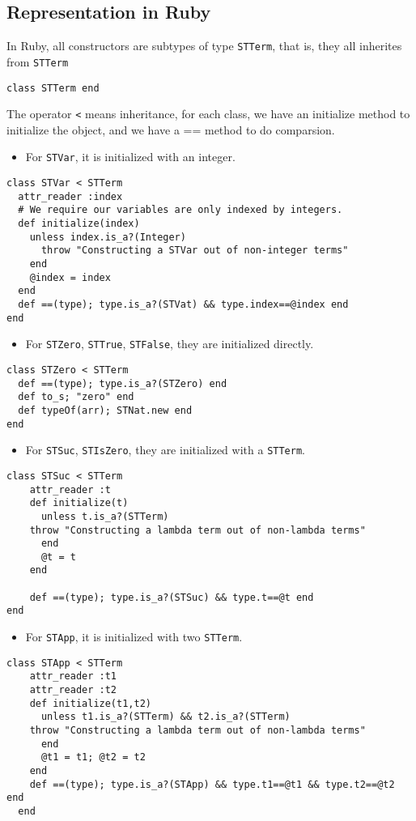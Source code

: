 \documentclass[11pt]{article}
\begin{document}
\subsection{Representation in Ruby}
\label{sec:org5bd2398}
In Ruby, all constructors are subtypes of type \texttt{STTerm}, that is, they all inherites from \texttt{STTerm}
\begin{verbatim}
class STTerm end
\end{verbatim}

The operator \texttt{<} means inheritance, for each class, we have an initialize method to initialize the object, and we have a == method to do comparsion.
\begin{itemize}
\item For \texttt{STVar}, it is initialized with an integer.
\end{itemize}
\begin{verbatim}
class STVar < STTerm
  attr_reader :index
  # We require our variables are only indexed by integers.
  def initialize(index)
    unless index.is_a?(Integer) 
      throw "Constructing a STVar out of non-integer terms"
    end
    @index = index
  end
  def ==(type); type.is_a?(STVat) && type.index==@index end
end
\end{verbatim}

\begin{itemize}
\item For \texttt{STZero}, \texttt{STTrue}, \texttt{STFalse}, they are initialized directly.
\end{itemize}
\begin{verbatim}
class STZero < STTerm
  def ==(type); type.is_a?(STZero) end
  def to_s; "zero" end
  def typeOf(arr); STNat.new end
end
\end{verbatim}

\begin{itemize}
\item For \texttt{STSuc}, \texttt{STIsZero}, they are initialized with a \texttt{STTerm}.
\end{itemize}
\begin{verbatim}
class STSuc < STTerm
    attr_reader :t
    def initialize(t)
      unless t.is_a?(STTerm)
	throw "Constructing a lambda term out of non-lambda terms"
      end
      @t = t
    end

    def ==(type); type.is_a?(STSuc) && type.t==@t end
end
\end{verbatim}

\begin{itemize}
\item For \texttt{STApp}, it is initialized with two \texttt{STTerm}.
\end{itemize}
\begin{verbatim}
class STApp < STTerm
    attr_reader :t1
    attr_reader :t2
    def initialize(t1,t2)
      unless t1.is_a?(STTerm) && t2.is_a?(STTerm)
	throw "Constructing a lambda term out of non-lambda terms"
      end
      @t1 = t1; @t2 = t2
    end
    def ==(type); type.is_a?(STApp) && type.t1==@t1 && type.t2==@t2 end
  end  
\end{verbatim}
\end{document}
